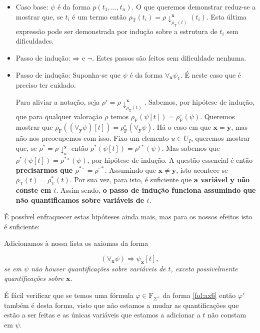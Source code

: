 \documentclass{report}
\theoremstyle{definition}
\theoremstyle{remark}
\renewcommand{\bf}[1]{\mathbf{#1}}
\newcommand{\F}{\mathrm{F}}
\newcommand{\T}{\mathrm{T}}
\newcommand{\imply}{\mathbin{\Rightarrow}}
\begin{document}
	\begin{itemize}
	\item Caso base: $\psi$ é da forma $p(t_1, \dots, t_n)$. O que queremos demonstrar reduz-se a mostrar que, se $t_i$ é um termo então $\rho_\T(t_i) = \rho\!\downarrow^{\bf x}_{\rho_\T(t)}(t_i)$. Esta última expressão pode ser demonstrada por indução sobre a estrutura de $t_i$ sem dificuldades.

	\item Passo de indução: $\imply$ e $\neg$. Estes passos são feitos sem dificuldade nenhuma.

	\item Passo de indução: Suponha-se que $\psi$ é da forma $\forall_{\bf x} \psi_1$. É neste caso que é preciso ter cuidado.

	Para aliviar a notação, seja $\rho^\circ = \rho\!\downarrow^{\bf x}_{\rho_\T(t)}$. Sabemos, por hipótese de indução, que para qualquer valoração $\rho$ temos $\rho_\F(\psi[t]) = \rho^\circ_\F(\psi)$. Queremos mostrar que $\rho_\F(\left(\forall_{\bf y} \psi\right)[t]) = \rho^\circ_\F(\forall_{\bf y} \psi)$. Há o caso em que $\bf x = \bf y$, mas não nos preocupemos com isso. Fixo um elemento $u \in U_I$, queremos mostrar que, se $\rho^* = \rho\!\downarrow^{\bf y}_u$ então $\rho^*(\psi[t]) = \rho^{\circ *}(\psi)$. Mas sabemos que $\rho^*(\psi[t]) = \rho^{* \circ}(\psi)$, por hipótese de indução. A questão essencial é então \textbf{precisarmos que $\rho^{*\circ} = \rho^{\circ *}$}. Assumindo que $\bf x \neq \bf y$, isto acontece se $\rho_\T(t) = \rho^*_\T(t)$. Por sua vez, para isto, é suficiente que \textbf{a variável $\bf y$ não conste em $t$}. Assim sendo, \textbf{o passo de indução funciona assumindo que não quantificamos sobre variáveis de $t$}.
	\end{itemize}

	É possível enfraquecer estas hipóteses ainda mais, mas para os nossos efeitos isto é suficiente:

	Adicionamos à nossa lista os axiomas da forma

	\begin{equation}\label{fol:ax6}
	(\forall_{\bf x} \psi) \imply \psi_{\bf x}[t],
	\end{equation}
	\emph{se em $\psi$ não houver quantificações sobre variáveis de $t$, exceto possivelmente quantificações sobre $\bf x$}.

	É fácil verificar que se temos uma fórmula $\varphi \in \F_{\Sigma^+}$ da forma \eqref{fol:ax6} então $\varphi'$ também é desta forma, visto que não estamos a mudar as quantificações que estão a ser feitas e as únicas variáveis que estamos a adicionar a $t$ não constam em $\psi$.
\end{document}
